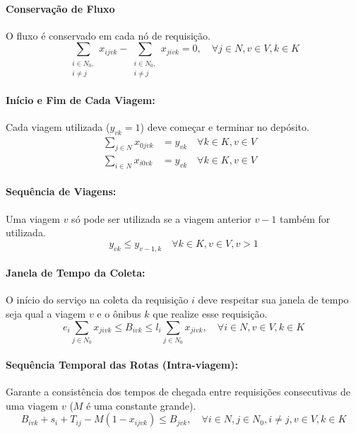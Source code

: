 \documentclass[12pt, a4paper]{article}
\begin{document}
\paragraph{Conservação de Fluxo} O fluxo é conservado em cada nó de requisição.
\begin{equation}
\sum_{\substack{i \in N_0,\\i \neq j}} x_{ijvk} - \sum_{\substack{i \in N_0,\\i \neq j}} x_{jivk} = 0, \quad \forall j \in N, v \in V, k \in K
\end{equation}

\paragraph{Início e Fim de Cada Viagem:} Cada viagem utilizada ($y_{vk} = 1$) deve começar e terminar no depósito.
\begin{align}
\sum_{j \in N} x_{0jvk} &= y_{vk} \quad \forall k \in K, v \in V & \\
\sum_{i \in N} x_{i0vk} &= y_{vk} \quad \forall k \in K, v \in V &
\end{align}

\paragraph{Sequência de Viagens:} Uma viagem $v$ só pode ser utilizada se a viagem anterior $v-1$ também for utilizada.
\begin{equation}
y_{vk} \le y_{v-1, k} \quad \forall k \in K, v \in V, v > 1
\end{equation}

\paragraph{Janela de Tempo da Coleta:} O início do serviço na coleta da requisição $i$ deve respeitar sua janela de tempo seja qual a viagem $v$ e o ônibus $k$ que realize esse requisição.
\begin{equation}
e_i \sum_{j \in N_0} x_{jivk} \le B_{ivk} \le l_i \sum_{j \in N_0} x_{jivk}, \quad \forall i \in N, v \in V, k \in K
\end{equation}

\paragraph{Sequência Temporal das Rotas (Intra-viagem):} Garante a consistência dos tempos de chegada entre requisições consecutivas de uma viagem $v$ ($M$ é uma constante grande).
\begin{equation}
B_{ivk} + s_i + T_{ij} - M(1 - x_{ijvk}) \le B_{jvk}, \quad \forall i \in N, j \in N_0, i \neq j, v \in V, k \in K
\end{equation}
\end{document}
